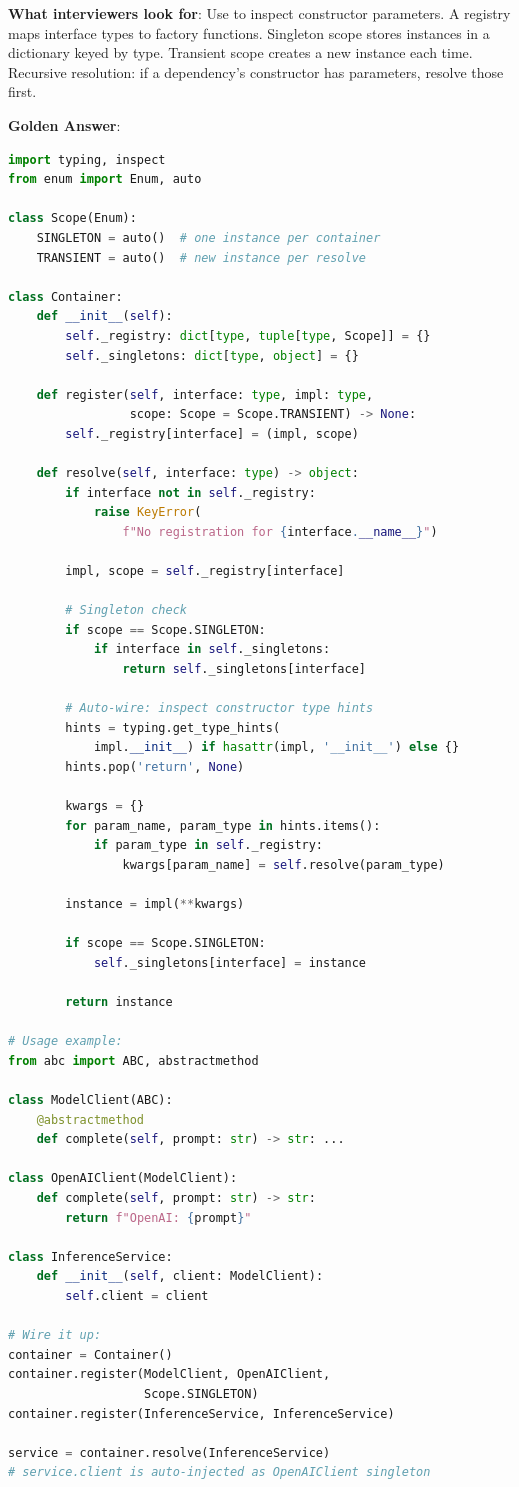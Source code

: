 \textbf{What interviewers look for}: Use  to inspect constructor parameters. A registry maps interface types to factory functions. Singleton scope stores instances in a dictionary keyed by type. Transient scope creates a new instance each time. Recursive resolution: if a dependency's constructor has parameters, resolve those first.

\textbf{Golden Answer}:

\begin{lstlisting}[language=Python]
import typing, inspect
from enum import Enum, auto

class Scope(Enum):
    SINGLETON = auto()  # one instance per container
    TRANSIENT = auto()  # new instance per resolve

class Container:
    def __init__(self):
        self._registry: dict[type, tuple[type, Scope]] = {}
        self._singletons: dict[type, object] = {}

    def register(self, interface: type, impl: type,
                 scope: Scope = Scope.TRANSIENT) -> None:
        self._registry[interface] = (impl, scope)

    def resolve(self, interface: type) -> object:
        if interface not in self._registry:
            raise KeyError(
                f"No registration for {interface.__name__}")

        impl, scope = self._registry[interface]

        # Singleton check
        if scope == Scope.SINGLETON:
            if interface in self._singletons:
                return self._singletons[interface]

        # Auto-wire: inspect constructor type hints
        hints = typing.get_type_hints(
            impl.__init__) if hasattr(impl, '__init__') else {}
        hints.pop('return', None)

        kwargs = {}
        for param_name, param_type in hints.items():
            if param_type in self._registry:
                kwargs[param_name] = self.resolve(param_type)

        instance = impl(**kwargs)

        if scope == Scope.SINGLETON:
            self._singletons[interface] = instance

        return instance

# Usage example:
from abc import ABC, abstractmethod

class ModelClient(ABC):
    @abstractmethod
    def complete(self, prompt: str) -> str: ...

class OpenAIClient(ModelClient):
    def complete(self, prompt: str) -> str:
        return f"OpenAI: {prompt}"

class InferenceService:
    def __init__(self, client: ModelClient):
        self.client = client

# Wire it up:
container = Container()
container.register(ModelClient, OpenAIClient,
                   Scope.SINGLETON)
container.register(InferenceService, InferenceService)

service = container.resolve(InferenceService)
# service.client is auto-injected as OpenAIClient singleton
\end{lstlisting}

